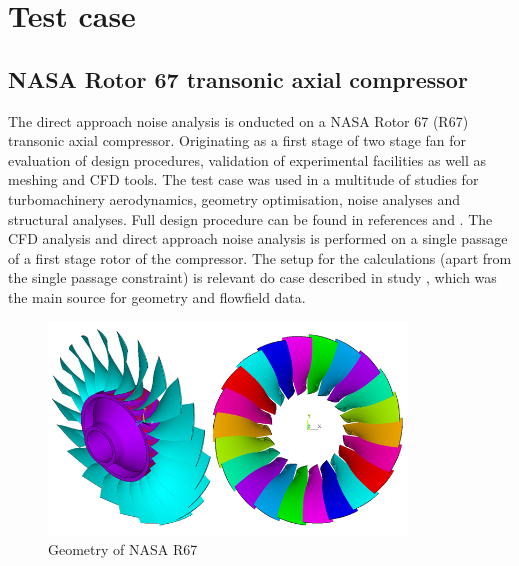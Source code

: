
\chapter{Test case} %

\label{case} %


\section{NASA Rotor 67 transonic axial compressor}

The direct approach noise analysis is onducted on a NASA Rotor 67 (R67) transonic axial compressor. Originating as a first stage of two stage fan for evaluation of design procedures, validation of experimental facilities as well as meshing and CFD tools. The test case was used in a multitude of studies for turbomachinery aerodynamics, geometry optimisation, noise analyses and structural analyses. Full design procedure can be found in references \cite{r67design} and \citep{r67performance}. The CFD analysis and direct approach noise analysis is performed on a single passage of a first stage rotor of the compressor. The setup for the  calculations (apart from the single passage constraint) is relevant do case described in study \citep{r67laser}, which was the main source for geometry and flowfield data.

\begin{figure}[h!]
\centering %
\includegraphics[width=0.85\textwidth]{Pictures/r67_over.png}
\caption{Geometry of NASA R67}
\label{r67over}
\end{figure}

